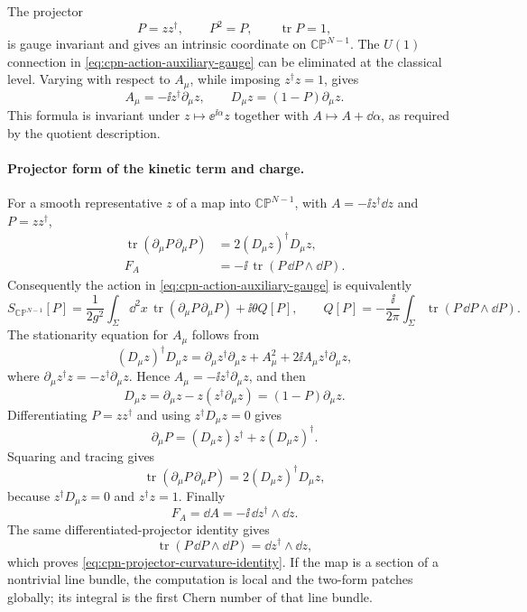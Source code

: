 The projector
\[
  P=z z^\dagger,\qquad P^2=P,\qquad \operatorname{tr}P=1,
\]
is gauge invariant and gives an intrinsic coordinate on
\(\mathbb{CP}^{N-1}\).  The \(U(1)\) connection in
\eqref{eq:cpn-action-auxiliary-gauge} can be eliminated at the classical
level.  Varying with respect to \(A_\mu\), while imposing \(z^\dagger z=1\),
gives
\begin{equation}
  A_\mu=-\ii z^\dagger\partial_\mu z,
  \qquad
  D_\mu z=(1-P)\partial_\mu z .
  \label{eq:cpn-auxiliary-connection-eliminated}
\end{equation}
This formula is invariant under \(z\mapsto \ee^{\ii\alpha}z\) together with
\(A\mapsto A+\dd\alpha\), as required by the quotient description.

\paragraph{Projector form of the kinetic term and charge.}
For a smooth representative \(z\) of a map into \(\mathbb{CP}^{N-1}\), with
\(A=-\ii z^\dagger\dd z\) and \(P=zz^\dagger\),
\begin{align}
  \operatorname{tr}(\partial_\mu P\,\partial_\mu P)
  &=2(D_\mu z)^\dagger D_\mu z,
  \label{eq:cpn-projector-kinetic-identity}\\
  F_A&=-\ii\,\operatorname{tr}(P\,\dd P\wedge\dd P).
  \label{eq:cpn-projector-curvature-identity}
\end{align}
Consequently the action in \eqref{eq:cpn-action-auxiliary-gauge} is
equivalently
\[
  S_{\mathbb{CP}^{N-1}}[P]
  =
  \frac1{2g^2}\int_\Sigma\dd^2x\,
  \operatorname{tr}(\partial_\mu P\,\partial_\mu P)
  +\ii\theta Q[P],
  \qquad
  Q[P]=-\frac{\ii}{2\pi}\int_\Sigma
  \operatorname{tr}(P\,\dd P\wedge\dd P).
\]
The stationarity equation for \(A_\mu\) follows from
\[
  (D_\mu z)^\dagger D_\mu z
  =
  \partial_\mu z^\dagger\partial_\mu z
  +A_\mu^2
  +2\ii A_\mu z^\dagger\partial_\mu z ,
\]
where \(\partial_\mu z^\dagger z=-z^\dagger\partial_\mu z\).  Hence
\(A_\mu=-\ii z^\dagger\partial_\mu z\), and then
\[
  D_\mu z
  =
  \partial_\mu z-z(z^\dagger\partial_\mu z)
  =
  (1-P)\partial_\mu z .
\]
Differentiating \(P=zz^\dagger\) and using \(z^\dagger D_\mu z=0\) gives
\[
  \partial_\mu P=(D_\mu z)z^\dagger+z(D_\mu z)^\dagger .
\]
Squaring and tracing gives
\[
  \operatorname{tr}(\partial_\mu P\,\partial_\mu P)
  =
  2(D_\mu z)^\dagger D_\mu z,
\]
because \(z^\dagger D_\mu z=0\) and \(z^\dagger z=1\).  Finally
\[
  F_A=\dd A=-\ii\,\dd z^\dagger\wedge\dd z .
\]
The same differentiated-projector identity gives
\[
  \operatorname{tr}(P\,\dd P\wedge\dd P)
  =
  \dd z^\dagger\wedge\dd z,
\]
which proves \eqref{eq:cpn-projector-curvature-identity}.  If the map is a
section of a nontrivial line bundle, the computation is local and the
two-form patches globally; its integral is the first Chern number of that
line bundle.

